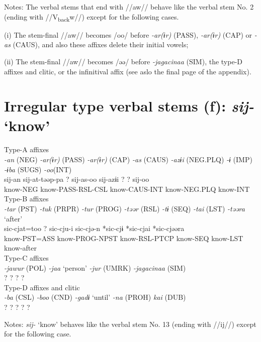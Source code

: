 Notes: The verbal stems that end with //aw// behave like the verbal stem No. 2 (ending with //V\textsubscript{back}w//) except for the following cases.

(i)  The stem-final //aw// becomes /oo/ before \textit{-ar(ɨr)} (PASS), \textit{-ar(ɨr)} (CAP) or \textit{-as} (CAUS), and also these affixes delete their initial vowels;

(ii)  The stem-final //aw// becomes /əə/ before \textit{-jagacinaa} (SIM), the type-D affixes and clitic, or the infinitival affix (see aslo the final page of the appendix).

\section{Irregular type verbal stems (f): \textit{sij-} ‘know’}

\ea Type-A affixes\\
\glll \textit{-an} (NEG)  \textit{-ar(ɨr)} (PASS)  \textit{-ar(ɨr)} (CAP)  \textit{-as} (CAUS)  \textit{-azɨi} (NEG.PLQ)  \textit{-ɨ} (IMP)  \textit{-ɨba} (SUGS)  \textit{-oo}(INT)\\
sij-an  sij-at-təəp-pa  ?  sij-as-oo  sij-azɨi  ?  ?  sij-oo\\
know-NEG  know-PASS-RSL-CSL    know-CAUS-INT  know-NEG.PLQ      know-INT\\


\ex Type-B affixes\\
\glll \textit{-tar} (PST)  \textit{-tuk} (PRPR)  \textit{-tur} (PROG)  \textit{-təər} (RSL)  \textit{-tɨ} (SEQ)  \textit{-tai} (LST)  \textit{-təəra} ‘after’\\
sic-cjat=too  ?  sic-cju-i  sic-cjə-n  *sic-cjɨ  *sic-cjai  *sic-cjəəra\\
know-PST=ASS    know-PROG-NPST  know-RSL-PTCP  know-SEQ  know-LST  know-after\\


\ex Type-C affixes\\
\gll \textit{-jawur} (POL)  \textit{-jaa} ‘person’  \textit{-jur} (UMRK)  \textit{-jagacinaa} (SIM)\\
?  ?  ?  ?\\


\ex Type-D affixes and clitic\\
\gll \textit{-ba} (CSL)  \textit{-boo} (CND)  \textit{-gadɨ} ‘until’  \textit{-na} (PROH)  \textit{kai} (DUB)\\
?  ?  ?  ?  ?\\
\z

Notes: \textit{sij-} ‘know’ behaves like the verbal stem No. 13 (ending with //ij//) except for the following case.

